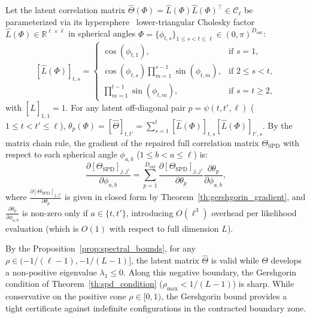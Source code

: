 \documentclass[default,sn-mathphys,Numbered]{sn-jnl}
\theoremstyle{thmstyleone}
\theoremstyle{thmstylethree}
\theoremstyle{thmstyletwo}
\newcommand{\outp}{\text{out}}
\begin{document}
Let the latent correlation matrix $\hat{\Theta}(\Phi) = \hat{L}(\Phi)\hat{L}(\Phi)^\top \in \mathcal{C}_\ell$ be parameterized via its hypersphere~\citep{HS} lower-triangular Cholesky factor $\hat{L}(\Phi) \in \mathbb{R}^{\ell \times \ell}$ in spherical angles $\Phi = \{\phi_{t,s}\}_{1 \le s < t \le \ell} \in (0, \pi)^{D_{\outp}}$:
\begin{equation}
\label{eq:cholesky_angles}
[\hat{L}(\Phi)]_{t,s} =
\begin{cases}
\cos(\phi_{t,1}), & \text{if } s = 1, \\
\cos(\phi_{t,s}) \prod_{m=1}^{s-1} \sin(\phi_{t,m}), & \text{if } 2 \le s < t, \\
\prod_{m=1}^{t-1} \sin(\phi_{t,m}), & \text{if } s = t \ge 2,
\end{cases}
\end{equation}
with $[\hat{L}]_{1,1} = 1$. For any latent off-diagonal pair $p = \psi(t, t', \ell)$ ($1 \le t < t' \le \ell$), $\theta_p(\Phi) = [\hat{\Theta}]_{t, t'} = \sum_{s=1}^t [\hat{L}(\Phi)]_{t,s}[\hat{L}(\Phi)]_{t',s}$. By the matrix chain rule, the gradient of the repaired full correlation matrix $\Theta_{\mathrm{SPD}}$ with respect to each spherical angle $\phi_{a,b}$ ($1 \le b < a \le \ell$) is:
\begin{equation}
\frac{\partial [\Theta_{\mathrm{SPD}}]_{j, j'}}{\partial \phi_{a,b}} = \sum_{p=1}^{D_{\outp}} \frac{\partial [\Theta_{\mathrm{SPD}}]_{j, j'}}{\partial \theta_p} \frac{\partial \theta_p}{\partial \phi_{a,b}},
\end{equation}
where $\frac{\partial [\Theta_{\mathrm{SPD}}]_{j, j'}}{\partial \theta_p}$ is given in closed form by Theorem~\ref{th:gershgorin_gradient}, and $\frac{\partial \theta_p}{\partial \phi_{a,b}}$ is non-zero only if $a \in \{t, t'\}$, introducing $O(\ell^3)$ overhead per likelihood evaluation (which is $O(1)$ with respect to full dimension $L$).

By the Proposition~\ref{prop:spectral_bounds}, for any $\rho \in (-1/(\ell-1), -1/(L-1)]$, the latent matrix $\hat{\Theta}$ is valid while $\Theta$ develops a non-positive eigenvalue $\lambda_1 \le 0$. Along this negative boundary, the Gershgorin condition of Theorem~\ref{th:spd_condition} ($\rho_{\max} < 1/(L-1)$) is sharp. While conservative on the positive cone $\rho \in [0, 1)$, the Gershgorin bound provides a tight certificate against indefinite configurations in the contracted boundary zone.
\end{document}
